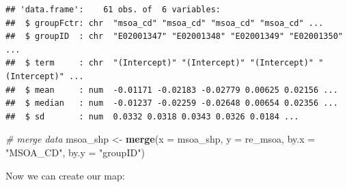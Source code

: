 \documentclass[]{book}
\newenvironment{Shaded}{\begin{snugshade}}{\end{snugshade}}
\newcommand{\KeywordTok}[1]{\textcolor[rgb]{0.13,0.29,0.53}{\textbf{#1}}}
\newcommand{\DataTypeTok}[1]{\textcolor[rgb]{0.13,0.29,0.53}{#1}}
\newcommand{\StringTok}[1]{\textcolor[rgb]{0.31,0.60,0.02}{#1}}
\newcommand{\CommentTok}[1]{\textcolor[rgb]{0.56,0.35,0.01}{\textit{#1}}}
\newcommand{\OperatorTok}[1]{\textcolor[rgb]{0.81,0.36,0.00}{\textbf{#1}}}
\newcommand{\NormalTok}[1]{#1}
\begin{document}
\begin{Shaded}
\end{Shaded}

\begin{verbatim}
## 'data.frame':    61 obs. of  6 variables:
##  $ groupFctr: chr  "msoa_cd" "msoa_cd" "msoa_cd" "msoa_cd" ...
##  $ groupID  : chr  "E02001347" "E02001348" "E02001349" "E02001350" ...
##  $ term     : chr  "(Intercept)" "(Intercept)" "(Intercept)" "(Intercept)" ...
##  $ mean     : num  -0.01171 -0.02183 -0.02779 0.00625 0.02156 ...
##  $ median   : num  -0.01237 -0.02259 -0.02648 0.00654 0.02356 ...
##  $ sd       : num  0.0332 0.0318 0.0343 0.0326 0.0184 ...
\end{verbatim}

\begin{Shaded}
\begin{Highlighting}[]
\CommentTok{# merge data}
\NormalTok{msoa_shp <-}\StringTok{ }\KeywordTok{merge}\NormalTok{(}\DataTypeTok{x =}\NormalTok{ msoa_shp, }\DataTypeTok{y =}\NormalTok{ re_msoa, }\DataTypeTok{by.x =} \StringTok{"MSOA_CD"}\NormalTok{, }\DataTypeTok{by.y =} \StringTok{"groupID"}\NormalTok{)}
\end{Highlighting}
\end{Shaded}

Now we can create our map:
\end{document}
